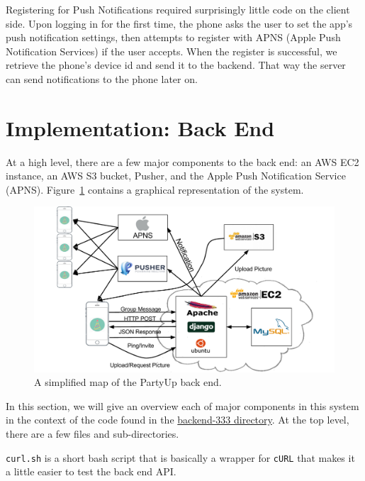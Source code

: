 \documentclass[12pt]{article}
\begin{document}
Registering for Push Notifications required surprisingly little code on the client side. Upon logging in for
the first time, the phone asks the user to set the app's push notification settings, then attempts
to register with APNS (Apple Push Notification Services) if the user accepts. When the register
is successful, we retrieve the phone's device id and send it to the backend. That way the server can
send notifications to the phone later on.


\section{Implementation: Back End}

At a high level, there are a few major components to the back end:
an AWS EC2 instance, an AWS S3 bucket, Pusher, and the Apple Push Notification Service (APNS).
Figure~\ref{fig:stack} contains a graphical representation of the system.

\begin{figure}[h]
    \centering
    \includegraphics[scale=0.4]{Stack.png}
    \caption{
        A simplified map of the PartyUp back end. 
    }
    \label{fig:stack}
\end{figure}


In this section, we will give an overview each of major components in this system
in the context of the code found in the
\href{https://github.com/BDGL-Hacks/backend-333}{backend-333 directory}.
At the top level, there are a few files and sub-directories.

\texttt{curl.sh} is a short bash script that is basically a wrapper for 
\texttt{cURL} that makes it a little easier to test the back end API.
\end{document}
